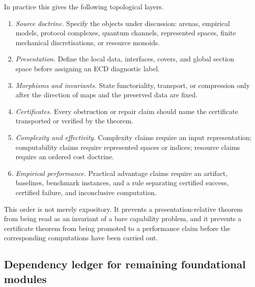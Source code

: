 \documentclass[11pt]{article}
\theoremstyle{plain}
\theoremstyle{definition}
\theoremstyle{remark}
\begin{document}
In practice this gives the following topological layers.
\begin{enumerate}[label=(\roman*)]
\item \emph{Source doctrine.} Specify the objects under discussion: arenas,
empirical models, protocol complexes, quantum channels, represented spaces,
finite mechanical discretisations, or resource monoids.
\item \emph{Presentation.} Define the local data, interfaces, covers, and global
section space before assigning an ECD diagnostic label.
\item \emph{Morphisms and invariants.} State functoriality, transport, or
compression only after the direction of maps and the preserved data are fixed.
\item \emph{Certificates.} Every obstruction or repair claim should name the
certificate transported or verified by the theorem.
\item \emph{Complexity and effectivity.} Complexity claims require an input
representation; computability claims require represented spaces or indices;
resource claims require an ordered cost doctrine.
\item \emph{Empirical performance.} Practical advantage claims require an
artifact, baselines, benchmark instances, and a rule separating certified
success, certified failure, and inconclusive computation.
\end{enumerate}
This order is not merely expository. It prevents a presentation-relative theorem
from being read as an invariant of a bare capability problem, and it prevents a
certificate theorem from being promoted to a performance claim before the
corresponding computations have been carried out.

\subsection{Dependency ledger for remaining foundational modules}
\label{subsec:foundational-dependency-ledger}
\end{document}

